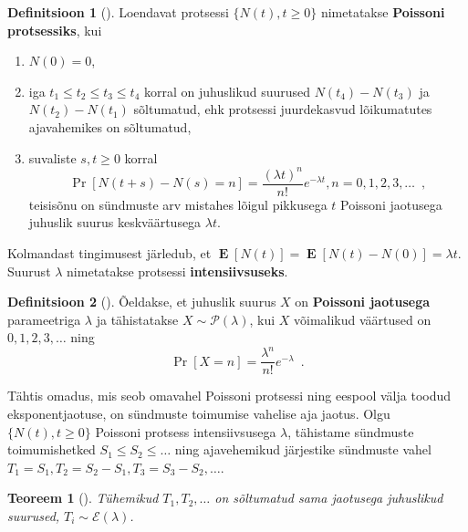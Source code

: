 \documentclass{article}
\newtheorem{theorem}{Teoreem}
\theoremstyle{definition}
\newtheorem{definition}{Definitsioon}
\DeclareMathOperator*{\MEAN}{\mathbf{E}}
\newcommand{\mean}[1]{\MEAN\left[#1\right]}
\newcommand{\prob}[1]{\Pr\left[#1\right]}
\begin{document}
\begin{definition}[\cite{juhuslikud-protsessid}]
    Loendavat protsessi $\{ N(t) , t \geq 0 \}$ nimetatakse \textbf{Poissoni protsessiks}, kui
    \begin{enumerate}
        \item $N(0) = 0$, 
        \item iga $t_1 \leq t_2 \leq t_3 \leq t_4$ korral on juhuslikud suurused $N(t_4) - N(t_3)$ ja $N(t_2) - N(t_1)$ sõltumatud, ehk protsessi juurdekasvud lõikumatutes ajavahemikes on sõltumatud,
        \item suvaliste $s, t \geq 0$ korral
        \begin{equation*}
            \prob{N(t + s) - N(s) = n} = \frac{(\lambda t)^n}{n!} e^{- \lambda t} , n = 0, 1, 2, 3, \dots \enspace ,
        \end{equation*}
        teisisõnu on sündmuste arv mistahes lõigul pikkusega $t$ Poissoni jaotusega juhuslik suurus keskväärtusega $\lambda t$.
    \end{enumerate}
\end{definition}

Kolmandast tingimusest järledub, et $\mean{N(t)} = \mean{N(t)- N(0)} = \lambda t$. Suurust $\lambda$ nimetatakse protsessi \textbf{intensiivsuseks}.

\begin{definition}[\cite{tõenäosusteooria-algkursus}]
    Õeldakse, et juhuslik suurus $X$ on \textbf{Poissoni jaotusega} parameetriga $\lambda$ ja tähistatakse $X \sim \mathcal{P}(\lambda)$, kui $X$ võimalikud väärtused on $0, 1, 2, 3, \dots$ ning
    \begin{equation*}
        \prob{X = n} = \frac{\lambda^n}{n!} e^{- \lambda} \enspace .
    \end{equation*}
\end{definition}

Tähtis omadus, mis seob omavahel Poissoni protsessi ning eespool välja toodud eksponentjaotuse, on sündmuste toimumise vahelise aja jaotus. Olgu $\{ N(t) , t \geq 0 \}$ Poissoni protsess intensiivsusega $\lambda$, tähistame sündmuste toimumishetked $S_1 \leq S_2 \leq \dots$ ning ajavehemikud järjestike sündmuste vahel $T_1 = S_1 , T_2 = S_2 - S_1 , T_3 = S_3 - S_2 , \dots$.

\begin{theorem}[{\cite[lk 38]{juhuslikud-protsessid}}]
    Tühemikud $T_1 , T_2 , \dots$ on sõltumatud sama jaotusega juhuslikud suurused, $T_i \sim \mathcal{E}(\lambda)$.
\end{theorem}
\end{document}
